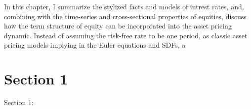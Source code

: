 \minitoc

\vspace{0.5cm}

In this chapter, I summarize the stylized facts and models of intrest rates, 
and, combining with the time-series and cross-sectional properties of equities, 
discuss how the term structure of equity can be incorporated into the asset pricing
dynamic. Instead of assuming the risk-free rate to be one period, as classic 
asset pricing models implying in the Euler equations and SDFs, a 

\section{Section 1}
Section 1: